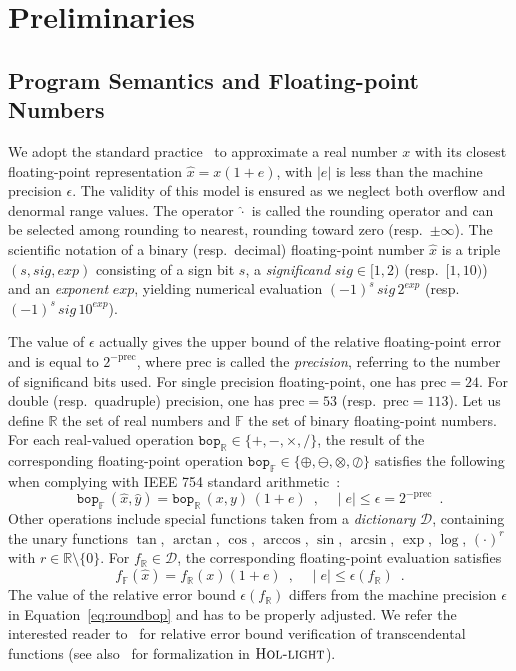 \documentclass[preprint,fleqn,nocopyrightspace]{sigplanconf}
\newcommand{\setD}{\mathcal{D}} %
\newcommand{\R}{\mathbb{R}}
\newcommand{\F}{\mathbb{F}}
\renewcommand{\prec}{\text{prec}}
\newcommand{\hol}{\text{\sc Hol-light}}
\newcommand{\bop}{\mathtt{bop}}
\theoremstyle{plain}
\begin{document}
\section{Preliminaries}
\label{sec:background}

\subsection{Program Semantics and Floating-point Numbers}
\label{sec:fpbackground}
We adopt the standard practice~\cite{higham2002accuracy} to approximate a real number $x$ with its closest floating-point representation $\hat{x} = x (1 + e)$, with $|e|$ is less than the machine precision $\epsilon$. The validity of this model is ensured as we neglect both overflow and denormal range values.
The operator $\hat{\cdot}$ is called the rounding operator and can be selected among rounding to nearest, rounding toward zero (resp.~$\pm\infty$).
The scientific notation of a binary (resp.~decimal) floating-point number $\hat{x}$ is a triple $(s, sig, exp)$ consisting of a sign bit $s$, a {\em significand} $sig \in [1, 2)$ (resp.~$[1, 10)$) and an {\em exponent} $exp$, yielding numerical evaluation $(-1)^{s} \, sig \, 2^{exp}$ (resp.~$(-1)^{s} \, sig \, 10^{exp}$). 

The value of $\epsilon$ actually gives the upper bound of the relative floating-point error and is equal to $2^{-\prec}$, where $\prec$ is called the {\em precision}, referring to the number of significand bits used. For single precision floating-point, one has $\prec = 24$. For double (resp.~quadruple) precision, one has $\prec = 53$ (resp.~$\prec=113$). Let us define $\R$ the set of real numbers and $\F$ the set of binary floating-point numbers.
For each real-valued operation $\bop_\R \in \{+, -, \times, \slash \}$, the result of the corresponding floating-point operation $\bop_\F \in \{\oplus, \ominus, \otimes, \oslash \}$ satisfies the following when complying with IEEE 754 standard arithmetic~\cite{IEEE}:
\begin{equation}
\label{eq:roundbop}
\bop_\F \, (\hat{x}, \hat{y}) = \bop_\R \, (x, y) \, (1 + e) \enspace, \quad \mid e \mid \leq \epsilon = 2^{-\prec} \enspace.
\end{equation}
%
Other operations include special functions taken from a {\em dictionary} $\setD$, containing the unary functions
$\tan$, $\arctan$, $\cos$, $\arccos$, $\sin$, $\arcsin$, $\exp$, $\log$, $(\cdot)^{r}$ with $r\in \R\setminus\{0\}$. For $f_\R \in \setD$, the corresponding floating-point evaluation satisfies 
\begin{equation}
\label{eq:roundtransc}
f_\F (\hat{x}) = f_\R (x) (1 + e) \enspace, \quad \mid e \mid \leq \epsilon (f_\R) \enspace.
\end{equation}
The value of the relative error bound $\epsilon (f_\R)$ differs from the machine precision $\epsilon$ in Equation~\eqref{eq:roundbop} and has to be properly adjusted. We refer the interested reader to~\cite{VerifCADTransc} for relative error bound verification of transcendental functions (see also~\cite{VerifHOLTransc} for formalization in $\hol$).
%
\end{document}
